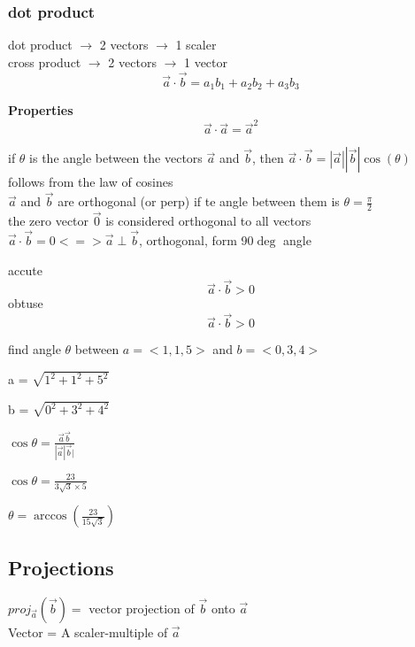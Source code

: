 \documentclass{article}
\begin{document}
\subsubsection{dot product}
dot product $\rightarrow$  2 vectors $\rightarrow$ 1 scaler \\
cross product $\rightarrow$  2 vectors $\rightarrow$ 1 vector \\

\[\vec{a} \cdot \vec{b} = a_1b_1+a_2b_2+a_3b_3\]

\textbf{Properties}
\[\vec{a} \cdot \vec{a} = \vec{a}^2\]

if $\theta$ is the angle between the vectors $\vec{a}$ and $\vec{b}$, then $\vec{a} \cdot \vec{b} =|\vec{a}||\vec{b}|\cos(\theta)$ \\

follows from the law of cosines \\

$\vec{a}$ and $\vec{b}$ are orthogonal (or perp) if te angle between them is $\theta=\frac{\pi}{2}$ \\

the zero vector $\vec{0}$ is considered orthogonal to all vectors \\

$\vec{a} \cdot \vec{b} = 0 <=> \vec{a} \perp \vec{b}$, orthogonal, form 90$\deg$ angle

\begin{center}
accute
\[ \vec{a} \cdot \vec{b} > 0 \]
obtuse
\[ \vec{a} \cdot \vec{b} > 0 \]
\end{center}

find angle $\theta$ between $a =<1,1,5>$ and $b=<0,3,4>$

\begin{center}
    
    a = $\sqrt{1^2+ 1^2+ 5^2}$
    
    b = $\sqrt{0^2 +3^2+ 4^2}$

    $\cos\theta = \frac{\vec{a}\vec{b}}{|\vec{a}|\vec{b}|}$

    $\cos\theta = \frac{23}{3\sqrt{3} \times 5}$

    $\theta = \arccos(\frac{23}{15\sqrt{3}})$
\end{center}

\subsection{Projections}

$proj_{\vec{a}}(\vec{b}) =$ vector projection of $\vec{b}$ onto $\vec{a}$ \\
Vector           = A scaler-multiple of $\vec{a}$\\
\end{document}
